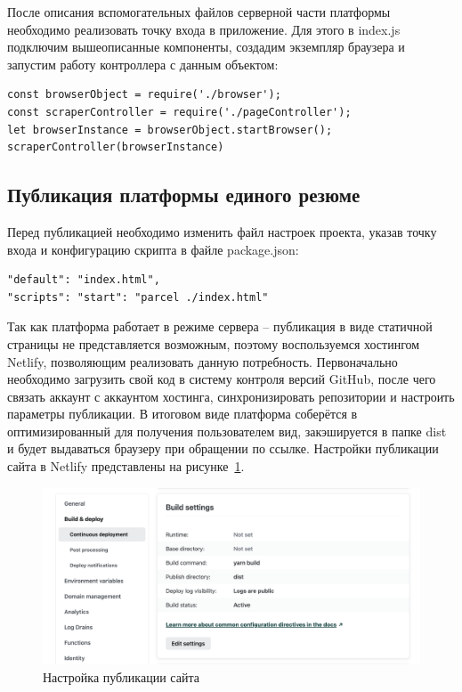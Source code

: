 \documentclass[master, och, diploma]{SCWorks}
\begin{document}
После описания вспомогательных файлов серверной части платформы необходимо реализовать точку входа в приложение. Для этого в index.js подключим вышеописанные компоненты, создадим экземпляр браузера и запустим работу контроллера с данным объектом:
\begin{verbatim}
const browserObject = require('./browser');
const scraperController = require('./pageController');
let browserInstance = browserObject.startBrowser();
scraperController(browserInstance)
\end{verbatim}


\subsection{Публикация платформы единого резюме}
Перед публикацией необходимо изменить файл настроек проекта, указав точку входа и конфигурацию скрипта в файле package.json:
\begin{verbatim}
"default": "index.html",
"scripts": "start": "parcel ./index.html"
\end{verbatim}


Так как платформа работает в режиме сервера – публикация в виде статичной страницы не представляется возможным, поэтому воспользуемся хостингом Netlify, позволяющим реализовать данную потребность. Первоначально необходимо загрузить свой код в систему контроля версий GitHub, после чего связать аккаунт с аккаунтом хостинга, синхронизировать репозитории и настроить параметры публикации. В итоговом виде платформа соберётся в оптимизированный для получения пользователем вид, закэшируется в папке dist и будет выдаваться браузеру при обращении по ссылке. Настройки публикации сайта в Netlify представлены на рисунке~\ref{fig:25}.
\begin{figure}[!ht]
    \centering
    \includegraphics[width=12cm]{images/image25.png}
    \caption{\label{fig:25}%
        Настройка публикации сайта}
\end{figure} 
\end{document}
